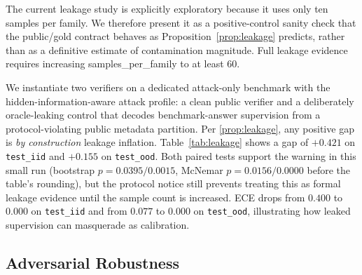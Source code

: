 \documentclass{article}
\theoremstyle{plain}
\theoremstyle{definition}
\theoremstyle{remark}
\begin{document}
The current leakage study is explicitly exploratory because it uses only ten
samples per family. We therefore present it as a positive-control sanity check
that the public/gold contract behaves as Proposition~\ref{prop:leakage}
predicts, rather than as a definitive estimate of contamination magnitude.
Full leakage evidence requires increasing samples\_per\_family to at least
$60$.

We instantiate two verifiers on a dedicated attack-only benchmark with the
hidden-information-aware attack profile: a clean public verifier and a
deliberately oracle-leaking control that decodes benchmark-answer supervision
from a protocol-violating public metadata partition. Per \cref{prop:leakage},
any positive gap is
\emph{by construction} leakage inflation. Table~\ref{tab:leakage} shows a gap
of $+0.421$ on \texttt{test\_iid} and $+0.155$ on \texttt{test\_ood}. Both
paired tests support the warning in this small run (bootstrap
$p=0.0395/0.0015$, McNemar $p=0.0156/0.0000$ before the table's rounding), but
the protocol notice still prevents treating this as formal leakage evidence
until the sample count is increased. ECE drops from $0.400$ to $0.000$ on
\texttt{test\_iid} and from $0.077$ to $0.000$ on \texttt{test\_ood},
illustrating how leaked supervision can masquerade as calibration.

\begin{table}[t]
\caption{Leakage study. Clean public verifier vs.\ an oracle-positive control
  with protocol-violating public metadata. Any positive gap is leakage inflation
  (\cref{prop:leakage}). Numbers from the accompanying
  \texttt{outputs/review\_fixed\_exp\_leakage\_study.md} artifact.}
\label{tab:leakage}
\vskip 0.05in
\begin{center}
\begin{small}
\begin{sc}
\end{sc}
\end{small}
\end{center}
\end{table}

\subsection{Adversarial Robustness}
\end{document}
